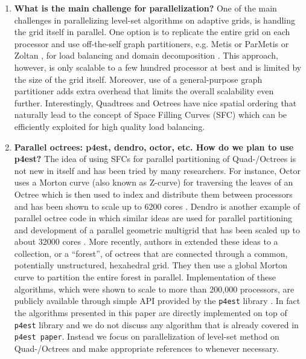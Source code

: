 \begin{enumerate}
\item \textbf{What is the main challenge for parallelization?}
One of the main challenges in parallelizing level-set algorithms on adaptive grids, is handling the grid itself in parallel. One option is to replicate the entire grid on each processor and use off-the-self graph partitioners, e.g. Metis or ParMetis  or Zoltan , for load balancing and domain decomposition . This approach, however, is only scalable to a few hundred processor at best and is limited by the size of the grid itself. Moreover, use of a general-purpose graph partitioner adds extra overhead that limits the overall scalability even further. Interestingly, Quadtrees and Octrees have nice spatial ordering that naturally lead to the concept of Space Filling Curves (SFC)  which can be efficiently exploited for high quality load balancing.

\item \textbf{Parallel octrees: p4est, dendro, octor, etc. How do we plan to use p4est?}
The idea of using SFCs for parallel partitioning of Quad-/Octrees is not new in itself and has been tried by many researchers. For instance, Octor  uses a Morton curve (also known as Z-curve) for traversing the leaves of an Octree which is then used to index and distribute them between processors and has been shown to scale up to 6200 cores . Dendro  is another example of parallel octree code in which similar ideas are used for parallel partitioning and development of a parallel geometric multigrid that has been scaled up to about 32000 cores . More recently, authors in  extended these ideas to a collection, or a ``forest'', of octrees that are connected through a common, potentially unstructured, hexahedral grid. They then use a global Morton curve to partition the entire forest in parallel. Implementation of these algorithms, which were shown to scale to more than 200,000 processors, are publicly available through simple API provided by the \texttt{p4est} library . In fact the algorithms presented in this paper are directly implemented on top of \texttt{p4est} library and we do not discuss any algorithm that is already covered in \texttt{p4est paper}. Instead we focus on parallelization of level-set method on Quad-/Octrees and make appropriate references to  whenever necessary.


\end{enumerate}
